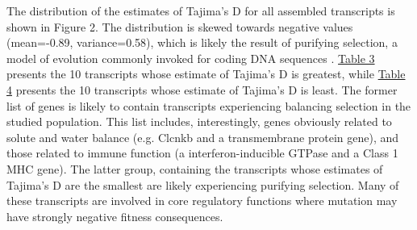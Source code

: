 \documentclass[11pt]{article}
\begin{document}
The distribution of the estimates of Tajima's D for all assembled transcripts is shown in Figure 2. The distribution is skewed towards negative values (mean=-0.89, variance=0.58), which is likely the result of purifying selection, a model of evolution commonly invoked for coding DNA sequences \cite{Chamary:2006db}. \hyperlink{Table 3}{Table 3} presents the 10 transcripts whose estimate of Tajima's D is greatest, while \hyperlink{Table 4}{Table 4} presents the 10 transcripts whose estimate of Tajima's D is least. The former list of genes is likely to contain transcripts experiencing balancing selection in the studied population. This list includes, interestingly, genes obviously related to solute and water balance (e.g. Clcnkb and a transmembrane protein gene), and those related to immune function (a interferon-inducible GTPase and a Class 1 MHC gene). The latter group, containing the transcripts whose estimates of Tajima's D are the smallest are likely experiencing purifying selection. Many of these transcripts are involved in core regulatory functions where mutation may have strongly negative fitness consequences. \\

\vspace{10mm}
\end{document}
